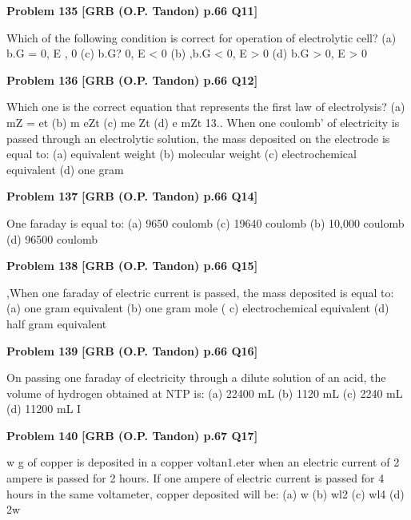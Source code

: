 \begin{problembox}
\textbf{Problem 135} \hfill \textbf{[GRB (O.P. Tandon) p.66 Q11]}
\label{q:ext-grb_all_questions-135}

Which of the following condition is correct for operation of 
electrolytic cell? 
(a) b.G = 0, E , 0 
(c) b.G? 0, E < 0 
(b) ,b.G < 0, E > 0 
(d) b.G > 0, E > 0
\end{problembox}

\begin{problembox}
\textbf{Problem 136} \hfill \textbf{[GRB (O.P. Tandon) p.66 Q12]}
\label{q:ext-grb_all_questions-136}

Which one is the correct equation that represents the first law 
of electrolysis? 
(a) mZ = et 
(b) m 
eZt 
(c) me 
Zt 
(d) e 
mZt 
13.. 
When one coulomb' of electricity is passed through an 
electrolytic solution, the mass deposited on the electrode is 
equal to: 
(a) equivalent weight 
(b) molecular weight 
(c) electrochemical equivalent (d) one gram
\end{problembox}

\begin{problembox}
\textbf{Problem 137} \hfill \textbf{[GRB (O.P. Tandon) p.66 Q14]}
\label{q:ext-grb_all_questions-137}

One faraday is equal to: 
(a) 9650 coulomb 
(c) 19640 coulomb 
(b) 10,000 coulomb 
(d) 96500 coulomb
\end{problembox}

\begin{problembox}
\textbf{Problem 138} \hfill \textbf{[GRB (O.P. Tandon) p.66 Q15]}
\label{q:ext-grb_all_questions-138}

,When one faraday of electric current is passed, the mass 
deposited is equal to: 
(a) one gram equivalent 
(b) one gram mole 
( c) electrochemical equivalent (d) half gram equivalent
\end{problembox}

\begin{problembox}
\textbf{Problem 139} \hfill \textbf{[GRB (O.P. Tandon) p.66 Q16]}
\label{q:ext-grb_all_questions-139}

On passing one faraday of electricity through a dilute solution 
of an acid, the volume of hydrogen obtained at NTP is: 
(a) 22400 mL 
(b) 1120 mL 
(c) 2240 mL 
(d) 11200 mL 
I
\end{problembox}

\begin{problembox}
\textbf{Problem 140} \hfill \textbf{[GRB (O.P. Tandon) p.67 Q17]}
\label{q:ext-grb_all_questions-140}

w g of copper is deposited in a copper voltan1.eter when an 
electric current of 2 ampere is passed for 2 hours. If one 
ampere of electric current is passed for 4 hours in the same 
voltameter, copper deposited will be: 
(a) w 
(b) wl2 
(c) wl4 
(d) 2w
\end{problembox}

